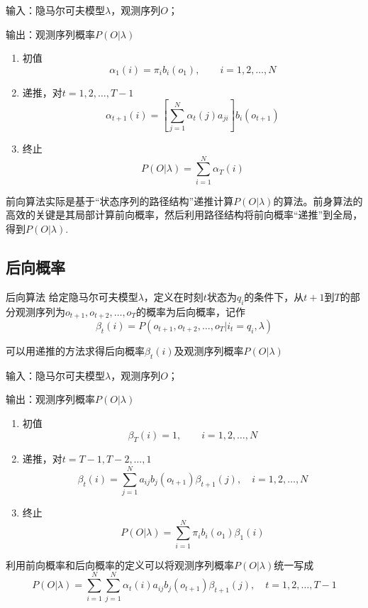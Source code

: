 输入：隐马尔可夫模型$\lambda$，观测序列$O$；

输出：观测序列概率$P(O|\lambda)$
\begin{enumerate}[(1)]
	\item 初值
	\begin{equation}
		\alpha_1(i)=\pi_ib_i(o_1),\qquad i=1,2,\dots,N
	\end{equation}
	\item 递推，对$t=1,2,\dots,T-1$
	\begin{equation}
		\alpha_{t+1}(i)=\left[ \sum_{j=1}^{N}\alpha_{t}(j)a_{ji} \right]b_i(o_{t+1})
	\end{equation}
	\item 终止
	\begin{equation}
		P(O|\lambda)=\sum_{i=1}^{N}\alpha_T(i)
	\end{equation}
\end{enumerate}
前向算法实际是基于“状态序列的路径结构”递推计算$P(O|\lambda)$的算法。前身算法的高效的关键是其局部计算前向概率，然后利用路径结构将前向概率“递推”到全局，得到$P(O|\lambda)$.
\subsection*{后向概率}
\begin{definition}{后向算法}{}
	给定隐马尔可夫模型$\lambda$，定义在时刻$t$状态为$q_i$的条件下，从$t+1$到$T$的部分观测序列为$o_{t+1},o_{t+2},\dots,o_{T}$的概率为后向概率，记作
	\begin{equation}
		\beta_t(i)=P(o_{t+1},o_{t+2},\dots,o_{T}|i_t=q_i,\lambda)
	\end{equation}
\end{definition}
可以用递推的方法求得后向概率$\beta_t(i)$及观测序列概率$P(O|\lambda)$

输入：隐马尔可夫模型$\lambda$，观测序列$O$；

输出：观测序列概率$P(O|\lambda)$
\begin{enumerate}[(1)]
	\item 初值
	\begin{equation}
	\beta_T(i)=1,\qquad i=1,2,\dots,N
	\end{equation}
	\item 递推，对$t=T-1,T-2,\dots,1$
	\begin{equation}
		\beta_t(i)=\sum_{j=1}^{N}a_{ij}b_j(o_{t+1})\beta_{t+1}(j),\quad i=1,2,\dots,N
	\end{equation}
	\item 终止
	\begin{equation}
	P(O|\lambda)=\sum_{i=1}^{N}\pi_ib_i(o_1)\beta_1(i)
	\end{equation}
\end{enumerate}
利用前向概率和后向概率的定义可以将观测序列概率$P(O|\lambda)$统一写成
\begin{equation}
	P(O|\lambda)=\sum_{i=1}^{N}\sum_{j=1}^{N}\alpha_{t}(i)a_{ij}b_j(o_{t+1})\beta_{t+1}(j),\quad t=1,2,\dots,T-1
\end{equation}

